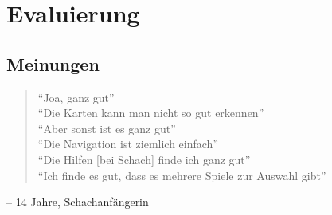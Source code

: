\chapter{Evaluierung}

\section{Meinungen}

\begin{quote}
``Joa, ganz gut'' \\
``Die Karten kann man nicht so gut erkennen'' \\
``Aber sonst ist es ganz gut'' \\
``Die Navigation ist ziemlich einfach'' \\
``Die Hilfen [bei Schach] finde ich ganz gut'' \\
``Ich finde es gut, dass es mehrere Spiele zur Auswahl gibt''
\end{quote}
-- 14 Jahre, Schachanfängerin
